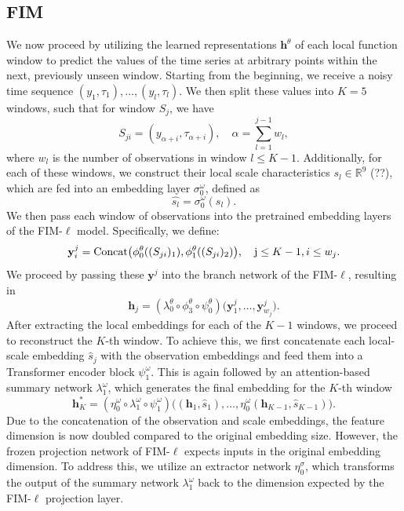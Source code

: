 \documentclass{article}
\theoremstyle{plain}
\theoremstyle{definition}
\theoremstyle{remark}
\begin{document}
\subsection{FIM}\label{sec:FIM}
We now proceed by utilizing the learned representations \(\mathbf{h}^{\theta}\) of each local function window to predict the values of the time series at arbitrary points within the next, previously unseen window.
Starting from the beginning, we receive a noisy time sequence \((y_1, \tau_1), \ldots, (y_l, \tau_l)\). 
We then split these values into \(K=5\) windows, such that for window \(S_j\), we have
\[
S_{ji} = (y_{\alpha + i}, \tau_{\alpha + i}), \quad \alpha = \sum_{l=1}^{j-1}w_l,
\]
where \(w_l\) is the number of observations in window \(l \leq K-1\).
Additionally, for each of these windows, we construct their local scale characteristics \(s_l \in \mathbb{R}^9\) (??), which are fed into an embedding layer \(\sigma^{\omega}_0\), defined as
\[
\hat{s_l} = \sigma^{\omega}_0(s_l).
\]
We then pass each window of observations into the pretrained embedding layers of the FIM-\(\ell\) model. Specifically, we define:
\[
    \mathbf{y}^j_i = \text{Concat}\big(\phi^{\theta}_0((S_{ji})_1), \phi^{\theta}_1((S_{ji})_2)\big), \quad \text j \leq K-1, i \leq w_j.
\]
We proceed by passing these \(\mathbf{y}^j\) into the branch network of the FIM-\(\ell\), resulting in
\[
    \mathbf{h}_j = (\lambda^{\theta}_0 \circ \phi^{\theta}_3 \circ \psi^{\theta}_0)\big(\mathbf{y}^{j}_1, \dots, \mathbf{y}^{j}_{w_j}\big).
\]
After extracting the local embeddings for each of the \(K-1\) windows, we proceed to reconstruct the \(K\)-th window. To achieve this, we first concatenate each local-scale embedding \(\hat{s}_j\) with the observation embeddings and feed them into a Transformer encoder block \(\psi^{\omega}_1\). This is again followed by an attention-based summary network \(\lambda^{\omega}_1\), which generates the final embedding for the \(K\)-th window
\[
    \mathbf{h}^{*}_K = (\eta^{\omega}_0 \circ \lambda^{\omega}_1 \circ \psi^{\omega}_1)\Big(( \mathbf{h}_1, \hat{s}_1), \ldots, \eta^{\omega}_0( \mathbf{h}_{K-1}, \hat{s}_{K-1})\Big).
\]
Due to the concatenation of the observation and scale embeddings, the feature dimension is now doubled compared to the original embedding size. However, the frozen projection network of FIM-\(\ell\) expects inputs in the original embedding dimension. To address this, we utilize an extractor network \(\eta^{\sigma}_0\), which transforms the output of the summary network $\lambda^{\omega}_1$ back to the dimension expected by the FIM-\(\ell\) projection layer.
\end{document}
